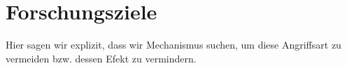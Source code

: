 \section{Forschungsziele}

Hier sagen wir explizit, dass wir Mechanismus suchen, um diese Angriffsart zu vermeiden bzw. dessen Efekt zu vermindern.


